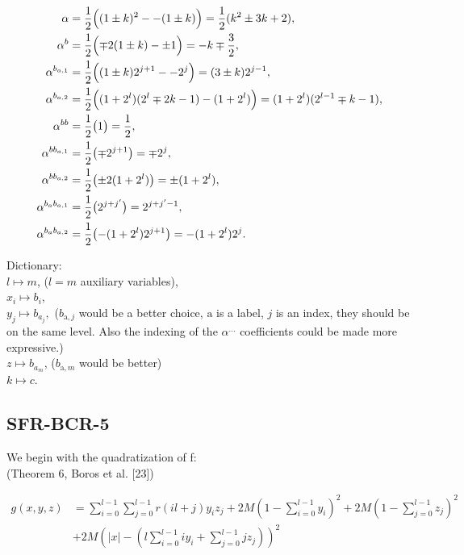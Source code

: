 \documentclass[a4paper,11pt]{article}
\begin{document}
\begin{subequations}
\label{eq:BCR34alpha}
\begin{align}
\alpha &=\frac12\Bigl((1\pm k)^2--(1\pm k) \Bigr)= \frac12(k^2\pm3k+2), \\
%
\alpha^{b} &= \frac12\Bigl(\mp 2(1\pm k)-\pm1\Bigr)= -k\mp\frac32, \\
\alpha^{b_{a,1}} &= \frac12\Bigl((1\pm k)2^{j+1}--2^j\Bigr)= (3\pm k)2^{j-1}, \\
\alpha^{b_{a,2}} &= \frac12\Bigl((1+2^l)(2^l\mp2k-1)-(1+2^l)\Bigr)= (1+2^l)(2^{l-1}\mp k-1), \\
%
\alpha^{bb} &= \frac12\bigl(1\bigr)= \frac12, \\
\alpha^{bb_{a,1}} &= \frac12\bigl(\mp2^{j+1}\bigr)= \mp2^j, \\
\alpha^{bb_{a,2}} &= \frac12\bigl(\pm2(1+2^l)\bigr)= \pm(1+2^l), \\
\alpha^{b_ab_{a,1}} &= \frac12\bigl(2^{j+j'}\bigr)= 2^{j+j'-1}, \\
\alpha^{b_ab_{a,2}} &= \frac12\bigl(-(1+2^l)2^{j+1}\bigr)= -(1+2^l)2^{j}.
\end{align}
\end{subequations}

Dictionary: \\
$l\mapsto m$, ($l=m$ auxiliary variables),\\
$x_i\mapsto b_i$, \\
$y_j\mapsto b_{a_j},$
($b_{\text{a},j}$ would be a better choice, $\text{a}$ is a label, $j$ is an index, they should be on the same level.
Also the indexing of the $\alpha^{\dots}$ coefficients could be made more expressive.)\\
$z\mapsto b_{a_m}$, ($b_{\text{a},m}$ would be better)\\
$k\mapsto c$.



\subsection{SFR-BCR-5}

We begin with the quadratization of f:
\\(Theorem 6, Boros et al. [23])

\begin{equation}
  \begin{split}
  \left.
  g(x,y,z)
  \right.
  &= \sum_{i=0}^{l-1}\sum_{j=0}^{l-1}r(il+j)y_iz_j
  + 2M\left(1-\sum_{i=0}^{l-1}y_i\right)^2 + 2M\left(1-\sum_{j=0}^{l-1}z_j\right)^2\\
  &+ 2M\left(|x| - \left(l\sum_{i=0}^{l-1}iy_i + \sum_{j=0}^{l-1}jz_j\right)\right)^2
  \end{split}
\end{equation}
\end{document}
